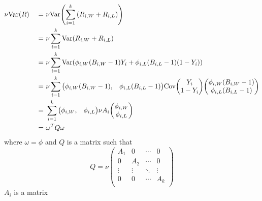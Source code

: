 \documentclass[11pt]{article} %
\let\originalleft\left
\let\originalright\right
\renewcommand{\left}{\mathopen{}\mathclose\bgroup\originalleft}
\renewcommand{\right}{\aftergroup\egroup\originalright}
\begin{document}
\begin{alignat*}{2}
	& \nu\text{Var}\left(R\right) &\ =\ & \nu\text{Var}\left(\sum_{i=1}^{k}{\left(R_{i, W} + R_{i, L}\right)}\right) \\
	& &\ =\ & \nu\sum_{i=1}^{k}\text{Var}\left(R_{i, W} + R_{i, L}\right)\\
	& &\ =\ & \nu\sum_{i=1}^{k}\text{Var}\left(\phi_{i, W}\left(B_{i, W}-1\right)Y_{i} + \phi_{i, L}\left(B_{i, L}-1\right)\left(1-Y_{i}\right)\right) \\
	& &\ =\ & \nu\sum_{i=1}^{k}{
	\begin{pmatrix}
	\phi_{i, W}\left(B_{i, W}-1\right),& \phi_{i, L}\left(B_{i, L}-1\right)
	\end{pmatrix}
	\text{Cov}
	\begin{pmatrix}
		Y_{i} \\
		1-Y_{i}
	\end{pmatrix}
	\begin{pmatrix}
	\phi_{i, W}\left(B_{i, W}-1\right)\\
	\phi_{i, L}\left(B_{i, L}-1\right)
	\end{pmatrix} }\\
	& &\ =\ & \sum_{i=1}^{k}{
	\begin{pmatrix}
	\phi_{i, W},& \phi_{i, L}
	\end{pmatrix}
	\nu A_i
	\begin{pmatrix}
	\phi_{i, W}\\
	\phi_{i, L}
	\end{pmatrix}} \\
	& &\ =\ & \omega^T Q \omega
\end{alignat*}
where $\omega = \phi$ and $Q$ is a matrix such that
\begin{equation*}
	Q = \nu
	\begin{pmatrix}
		A_1 & 0 & \cdots & 0\\
		0 & A_2 & \cdots & 0\\
		\vdots & \vdots & \ddots & \vdots \\
		0 & 0 & \cdots & A_k \\
	\end{pmatrix}
\end{equation*}
$A_i$ is a matrix
\end{document}

